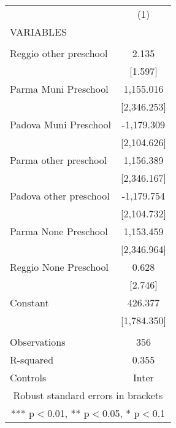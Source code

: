 \begin{tabular}{lc} \hline
 & (1) \\
VARIABLES &  \\ \hline
 &  \\
Reggio other preschool & 2.135 \\
 & [1.597] \\
Parma Muni Preschool & 1,155.016 \\
 & [2,346.253] \\
Padova Muni Preschool & -1,179.309 \\
 & [2,104.626] \\
Parma other preschool & 1,156.389 \\
 & [2,346.167] \\
Padova other preschool & -1,179.754 \\
 & [2,104.732] \\
Parma None Preschool & 1,153.459 \\
 & [2,346.964] \\
Reggio None Preschool & 0.628 \\
 & [2.746] \\
Constant & 426.377 \\
 & [1,784.350] \\
 &  \\
Observations & 356 \\
R-squared & 0.355 \\
 Controls & Inter \\ \hline
\multicolumn{2}{c}{ Robust standard errors in brackets} \\
\multicolumn{2}{c}{ *** p$<$0.01, ** p$<$0.05, * p$<$0.1} \\
\end{tabular}
